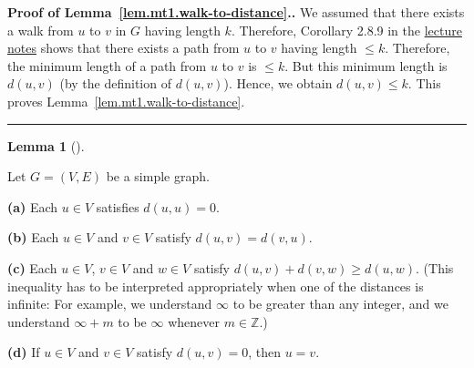 \documentclass[numbers=enddot,12pt,final,onecolumn,notitlepage]{scrartcl}%
\theoremstyle{definition}
\newtheorem{lem}[theo]{Lemma}
\newenvironment{lemma}[1][]
{\begin{lem}[#1]\begin{leftbar}}
{\end{leftbar}\end{lem}}
\newenvironment{proof}[1][Proof]{\noindent\textbf{#1.} }{\ \rule{0.5em}{0.5em}}
\newcommand{\ZZ}{\mathbb{Z}}
\newcommand{\tup}[1]{\left( #1 \right)}
\begin{document}
\begin{proof}[Proof of Lemma~\ref{lem.mt1.walk-to-distance}.]
We assumed that there exists a walk from $u$ to $v$ in $G$ having
length $k$. Therefore, Corollary 2.8.9 in the
\href{http://www-users.math.umn.edu/~dgrinber/5707s17/nogra.pdf}{lecture notes}
shows that there exists a path from $u$ to $v$ having length
$\leq k$. Therefore, the minimum length of a path from $u$ to $v$
is $\leq k$. But this minimum length is $d \tup{u, v}$ (by the
definition of $d \tup{u, v}$). Hence, we obtain
$d \tup{u, v} \leq k$. This proves
Lemma~\ref{lem.mt1.walk-to-distance}.
\end{proof}

\begin{lemma} \label{lem.mt1.distances-metric}
Let $G = \tup{V, E}$ be a simple graph.

\textbf{(a)} Each $u \in V$ satisfies $d \tup{u, u} = 0$.

\textbf{(b)} Each $u \in V$ and $v \in V$ satisfy
$d \tup{u, v} = d \tup{v, u}$.

\textbf{(c)} Each $u \in V$, $v \in V$ and $w \in V$ satisfy
$d \tup{u, v} + d \tup{v, w} \geq d \tup{u, w}$.
(This inequality has to be interpreted appropriately when one of the
distances is infinite: For example, we understand $\infty$ to be
greater than any integer, and we understand $\infty + m$ to be
$\infty$ whenever $m \in \ZZ$.)

\textbf{(d)} If $u \in V$ and $v \in V$ satisfy $d \tup{u, v} = 0$,
then $u = v$.
\end{lemma}
\end{document}
